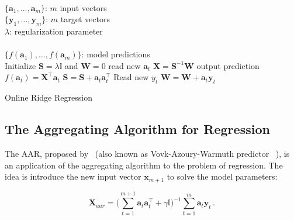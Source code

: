 \begin{algorithm}[H]
\begin{algorithmic}[1]
\REQUIRE $\,$ \\
$\{\mathbf{a}_1,\dots,\mathbf{a}_{m} \}$: $m$ input vectors \\
$\{\mathbf{y}_1,\dots,\mathbf{y}_{m} \}$: $m$ target vectors \\
$\lambda$: regularization parameter \\
\ENSURE  $\,$ \\
$\{f(\mathbf{a}_1),\dots,f(\mathbf{a}_{m}) \}$: model predictions \\
\STATE Initialize $\mathbf{S}=\lambda \mathbb{I}$
and $\mathbf{W}=0$
	\STATE read new $\mathbf{a}_t$
	\STATE $\mathbf{X}=\mathbf{S}^{-1}\mathbf{W}$
	\STATE output prediction $f(\mathbf{a}_t) = \mathbf{X}^\top \mathbf{a}_t$
   	\STATE $\mathbf{S} = \mathbf{S} + \mathbf{a}_t \mathbf{a}_t^\top$
   	\STATE Read new $y_t$
    	\STATE $\mathbf{W} = \mathbf{W} + \mathbf{a}_t \mathbf{y}_t$
\ENDFOR
\end{algorithmic}
\caption{Online Ridge Regression}
\label{alg:RR}
\end{algorithm}



\subsection{The Aggregating Algorithm for Regression}

The AAR, proposed by~\cite{vovk2001} (also known as Vovk-Azoury-Warmuth predictor ~\cite{azoury2001}), is an application of the aggregating
algorithm to the problem of regression. The idea is introduce the new input
vector $\mathbf{x}_{m+1}$ to solve the model parameters: 

\begin{equation}
\label{eq:AARexpand}
\mathbf{X}_{aar} = \displaystyle \big (\sum_{t=1}^{m+1}
\mathbf{a}_t \mathbf{a}_t  ^\intercal + \gamma \mathbb{I}\big )^{-1}
\sum_{t=1}^m \mathbf{a}_t \mathbf{y}_t \, .
\end{equation}

